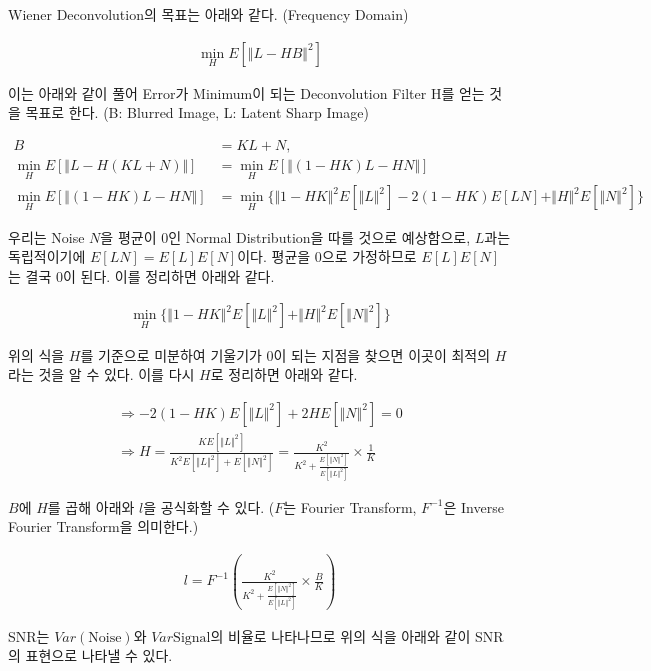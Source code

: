 \documentclass{report}
\begin{document}
Wiener Deconvolution의 목표는 아래와 같다. (Frequency Domain)

\begin{align*}
    \mathop{\min}\limits_{H} E[\Vert L-HB \Vert ^2]
\end{align*}

이는 아래와 같이 풀어 Error가 Minimum이 되는 Deconvolution Filter H를 얻는 것을 목표로 한다. (B: Blurred Image, L: Latent Sharp Image)

\begin{align*}
    B &= KL + N, \\ 
    \mathop{\min}\limits_{H} E[\Vert L-H(KL+N) \Vert] &= \mathop{\min}\limits_{H} E[\Vert (1-HK)L-HN \Vert] \\
    \mathop{\min}\limits_{H} E[\Vert (1-HK)L-HN \Vert] &=
    \mathop{\min}\limits_{H} \{\Vert 1-HK \Vert ^2 E[\Vert L \Vert ^2]-2(1-HK)E[LN] + \Vert H \Vert ^2 E[\Vert N \Vert ^ 2]\}
\end{align*}

우리는 Noise $N$을 평균이 0인 Normal Distribution을 따를 것으로 예상함으로, $L$과는 독립적이기에 $E[LN]=E[L]E[N]$이다.
평균을 0으로 가정하므로 $E[L]E[N]$는 결국 0이 된다. 이를 정리하면 아래와 같다.

\begin{align*}
    \mathop{\min}\limits_{H} \{\Vert 1-HK \Vert ^2 E[\Vert L \Vert ^2] + \Vert H \Vert ^2 E[\Vert N \Vert ^ 2]\}
\end{align*}

위의 식을 $H$를 기준으로 미분하여 기울기가 0이 되는 지점을 찾으면 이곳이 최적의 $H$라는 것을 알 수 있다.
이를 다시 $H$로 정리하면 아래와 같다.

\begin{align*}
    \Rightarrow -2(1-HK)E[\Vert L \Vert ^ 2] + 2HE[\Vert N \Vert ^2]=0 \\
    \Rightarrow H = \frac{KE[\Vert L \Vert ^2]}{K^2E[\Vert L \Vert ^2]+ E[\Vert N \Vert ^2]} = \frac{K^2}{K^2+\frac{E[\Vert N \Vert ^2]}{E[\Vert L \Vert ^2]}} \times \frac{1}{K}
\end{align*}

$B$에 $H$를 곱해 아래와 $l$을 공식화할 수 있다. ($F$는 Fourier Transform, $F^{-1}$은 Inverse Fourier Transform을 의미한다.)

\begin{align*}
    l=F^{-1}(\frac{K^2}{K^2+\frac{E[\Vert N \Vert ^2]}{E[\Vert L \Vert ^2]}} \times \frac{B}{K})
\end{align*}

SNR는 $Var(\text{Noise})$와 $Var{\text{Signal}}$의 비율로 나타나므로 위의 식을 아래와 같이 SNR의 표현으로 나타낼 수 있다.
\end{document}
